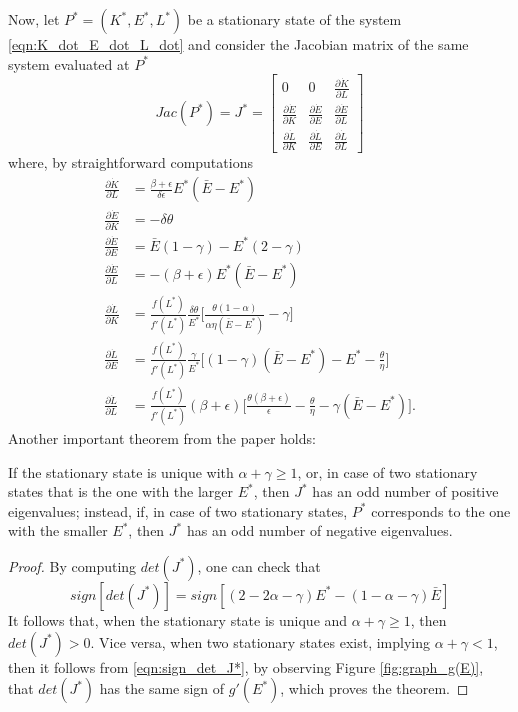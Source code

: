 Now, let $P^*=(K^*,E^*,L^*)$ be a stationary state of the system \eqref{eqn:K_dot_E_dot_L_dot} and consider the Jacobian matrix of the same system evaluated at $P^*$
$$
Jac(P^*)=J^* =
\begin{bmatrix}
	0 & 
	0 & 
	\frac{\partial\dot{K}}{\partial L} \\[1ex] %
	\frac{\partial\dot{E}}{\partial K} & 
	\frac{\partial\dot{E}}{\partial E} & 
	\frac{\partial\dot{E}}{\partial L} \\[1ex]
	\frac{\partial\dot{L}}{\partial K} & 
	\frac{\partial\dot{L}}{\partial E} & 
	\frac{\partial\dot{L}}{\partial L}
\end{bmatrix}
$$
where, by straightforward computations
\begin{equation} \label{eqn:part_deriv_Kdot_Ldot_Edot}
	\begin{split}
		\frac{\partial\dot{K}}{\partial L} &= \frac{\beta+\epsilon}{\delta\epsilon}E^*(\bar{E}-E^*)\\
		\frac{\partial\dot{E}}{\partial K} &=-\delta\theta \\
		\frac{\partial\dot{E}}{\partial E} &=\bar{E}(1-\gamma)-E^*(2-\gamma)\\
		\frac{\partial\dot{E}}{\partial L} &=-(\beta+\epsilon)E^*(\bar{E}-E^*)\\
		\frac{\partial\dot{L}}{\partial K} &=\frac{f(L^*)}{f'(L^*)}\frac{\delta\theta}{E^*} \Bigg[\frac{\theta(1-\alpha)}{\alpha\eta(\bar{E}-E^*)}-\gamma\Bigg]\\
		\frac{\partial\dot{L}}{\partial E} &=\frac{f(L^*)}{f'(L^*)}\frac{\gamma}{E^*} \Bigg[ (1-\gamma)(\bar{E}-E^*)-E^*-\frac{\theta}{\eta} \Bigg]\\
		\frac{\partial\dot{L}}{\partial L} &=\frac{f(L^*)}{f'(L^*)}(\beta+\epsilon) \Bigg[ \frac{\theta(\beta+\epsilon)}{\epsilon}-\frac{\theta}{\eta}-\gamma(\bar{E}-E^*) \Bigg].
	\end{split}
\end{equation}
Another important theorem from the paper holds: 
\begin{thm} \label{thm:num_eigenval_from_Jac}
	If the stationary state is unique with $\alpha+\gamma\geq1$, or, in case of two stationary states that is the one with the larger $E^*$, then $J^*$ has an odd number of positive eigenvalues; instead, if, in case of two stationary states, $P^*$ corresponds to the one with the smaller $E^*$, then $J^*$ has an odd number of negative eigenvalues.
\end{thm}
\begin{proof}
	By computing $det(J^*)$, one can check that
	\begin{equation} \label{eqn:sign_det_J*}
		sign[det(J^*)] = sign[(2-2\alpha-\gamma)E^*-(1-\alpha-\gamma)\bar{E}]
	\end{equation}
	It follows that, when the stationary state is unique and $\alpha+\gamma\geq1$, then $det(J^*) > 0$. Vice versa, when two stationary states exist, implying $\alpha+\gamma<1$, then it follows from \eqref{eqn:sign_det_J*}, by observing Figure \ref{fig:graph_g(E)}, that $det(J^*)$ has the same sign of $g'(E^*)$, which proves the theorem. 
\end{proof}

